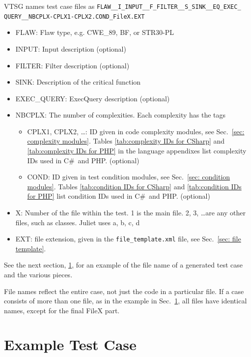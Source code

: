 \documentclass[12pt]{article}
\newcommand{\CSharp}{C{\fontseries{b}\selectfont\#}}
\begin{document}
VTSG names test case files as
\verb|FLAW__I_INPUT__F_FILTER__S_SINK__EQ_EXEC_| \\
\verb|QUERY__NBCPLX-CPLX1-CPLX2.COND_FileX.EXT|
\begin{itemize}
    \item FLAW: Flaw type, e.g. CWE\_89, BF, or STR30-PL
    \item INPUT:  Input description (optional)
    \item FILTER:  Filter description (optional)
    \item SINK:  Description of the critical function
    \item EXEC\_QUERY:  ExecQuery description (optional)
    
    \item NBCPLX:  The number of complexities. Each complexity has the tags 
    \begin{itemize}
        \item CPLX1, CPLX2, \ldots: ID given in 
            code complexity modules, 
            see Sec.~\ref{sec: complexity modules}.
            Tables \ref{tab:complexity IDs for CSharp} and
            \ref{tab:complexity IDs for PHP} in the language appendixes list
            complexity IDs used in \CSharp\ and PHP.
            (optional)
        \item COND: ID given in test condition modules,
            see Sec.~\ref{sec: condition modules}.
            Tables \ref{tab:condition IDs for CSharp} and
            \ref{tab:condition IDs for PHP} list condition
            IDs used in \CSharp\ and PHP. (optional)
    \end{itemize}
    \item X: Number of the file within the test. 
    1 is the main file. 2, 3, 
    \ldots are any other files, such as classes. {\Large Juliet uses a, b, c, d}
    \item EXT: file extension, given in the \verb|file_template.xml| file, see
    Sec.~\ref{sec: file template}.
\end{itemize}

See the next section, \ref{sec:generated files}, for an example of the file name of a
generated test case and the various pieces.

File names reflect the entire case, not just the code in a 
particular file.  If a case consists of more than one file, as in the
example in Sec.~\ref{sec:generated files}, all files have
identical names, except for the final FileX part.

\section{Example Test Case}
\label{sec:generated files}
\end{document}
